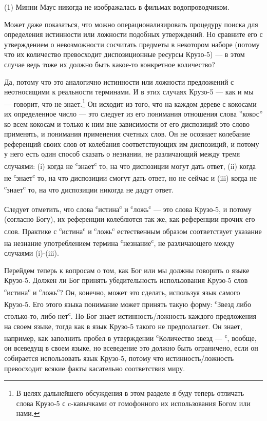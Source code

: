 \documentclass[11pt]{book}
\begin{document}
\smallskip

(1) Минни Маус никогда не изображалась в фильмах водопроводчиком.

\smallskip

Может даже показаться, что можно операционализировать процедуру поиска для определения истинности или ложности подобных утверждений. Но сравните его с утверждением о невозможности сосчитать предметы в некотором наборе (потому что их количество превосходит диспозиционные ресурсы Крузо-5) --- в этом случае ведь тоже их должно быть какое-то конкретное количество?

Да, потому что это аналогично истинности или ложности предложений с неотносящими к реальности терминами. И в этих случаях Крузо-5 --- как и мы --- говорит, что не знает.\footnote{В целях дальнейшего обсуждения в этом разделе я буду теперь отличать слова Крузо-5 с c-кавычками от гомофонного их использования Богом или нами.} Он исходит из того, что на каждом дереве с кокосами их определенное число --- это следует из его понимания отношения слова ''кокос'' ко всем кокосам и только к ним вне зависимости от его диспозиций это слово применять, и понимания применения счетных слов. Он не осознает колебание референций своих слов от колебания соответствующих им диспозиций, и потому у него есть один способ сказать о незнании, не различающий между тремя случаями: (i) когда не \textsuperscript{c}знает\textsuperscript{c} то, на что диспозиции могут дать ответ, (ii) когда не \textsuperscript{c}знает\textsuperscript{c} то, на что диспозиции смогут дать ответ, но не сейчас и (iii) когда не \textsuperscript{c}знает\textsuperscript{c} то, на что диспозиции никогда не дадут ответ.

Следует отметить, что слова \textsuperscript{c}истина\textsuperscript{c} и \textsuperscript{c}ложь\textsuperscript{c} --- это слова Крузо-5, и потому (согласно Богу), их референции колеблются так же, как референции прочих его слов. Практике с \textsuperscript{c}истина\textsuperscript{c} и \textsuperscript{c}ложь\textsuperscript{c} естественным образом соответствует указание на незнание употреблением термина \textsuperscript{c}незнание\textsuperscript{c}, не различающего между случаями (i)-(iii).

Перейдем теперь к вопросам о том, как Бог или мы должны говорить о языке Крузо-5. Должен ли Бог принять убедительность использования Крузо-5 слов \textsuperscript{c}истина\textsuperscript{c} и \textsuperscript{c}ложь\textsuperscript{c}? Он, конечно, может это сделать, используя язык самого Крузо-5. Его этого языка понимание может принять такую форму: \textsuperscript{c}Звезд либо столько-то, либо нет\textsuperscript{c}. Но Бог знает истинность/ложность каждого предложения на своем языке, тогда как в язык Крузо-5 такого не предполагает. Он знает, например, как заполнить пробел в утверждении \textsuperscript{c}Количество звезд --- \textsuperscript{c}, вообще, он всеведущ в своем языке, но всеведение это должно быть ограничено, если он собирается использовать язык Крузо-5, потому что истинность/ложность превосходит всякие факты касательно соответствия миру.
\end{document}
